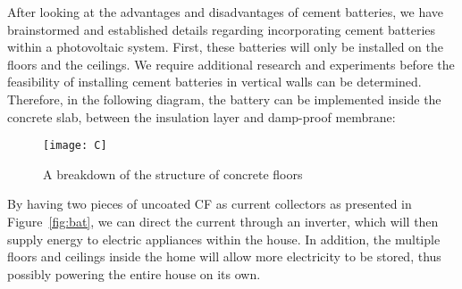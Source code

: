 After looking at the advantages and disadvantages of cement batteries, we have brainstormed and established details regarding incorporating cement batteries within a photovoltaic system. First, these batteries will only be installed on the floors and the ceilings. We require additional research and experiments before the feasibility of installing cement batteries in vertical walls can be determined. Therefore, in the following diagram, the battery can be implemented inside the concrete slab, between the insulation layer and damp-proof membrane:
\begin{figure}[H]
\centering
\texttt{[image: C]}
\caption{A breakdown of the structure of concrete floors}\cite{property:floor}
\end{figure}
By having two pieces of uncoated CF as current collectors as presented in Figure~\ref{fig:bat}, we can direct the current through an inverter, which will then supply energy to electric appliances within the house. In addition, the multiple floors and ceilings inside the home will allow more electricity to be stored, thus possibly powering the entire house on its own.